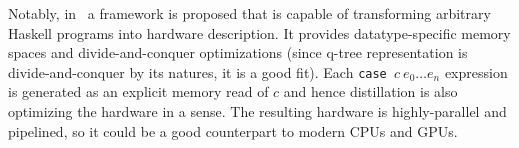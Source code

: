 \documentclass[acmsmall,review,nonacm]{acmart}\settopmatter{printfolios=true,printccs=false,printacmref=false}
\begin{document}
Notably, in~\cite{Edwards2019FHWP} a framework is proposed that is capable of transforming arbitrary Haskell programs into hardware description. It provides datatype-specific memory spaces and divide-and-conquer optimizations (since q-tree representation is divide-and-conquer by its natures, it is a good fit). Each \texttt{case }$c\: e_0 \ldots e_n$ expression is generated as an explicit memory read of $c$ and hence distillation is also optimizing the hardware in a sense. The resulting hardware is highly-parallel and pipelined, so it could be a good counterpart to modern CPUs and GPUs.









\appendix
\end{document}
